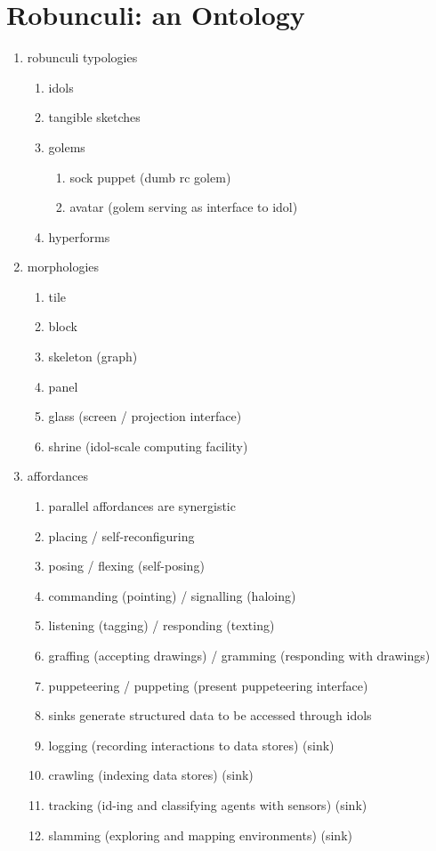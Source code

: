 \section{Robunculi: an Ontology}
\label{sec:robunculi_ontology}
    \begin{enumerate}
        \item robunculi typologies
        \begin{enumerate}
            \item idols
            \item tangible sketches
            \item golems
            \begin{enumerate}
                \item sock puppet (dumb rc golem)
                \item avatar (golem serving as interface to idol)
            \end{enumerate}
            \item hyperforms
        \end{enumerate}
        \item morphologies
        \begin{enumerate}
            \item tile
            \item block
            \item skeleton (graph)
            \item panel
            \item glass (screen / projection interface)
            \item shrine (idol-scale computing facility)
        \end{enumerate}
        \item affordances
        \begin{enumerate}
            \item parallel affordances are synergistic
            \item placing / self-reconfiguring
            \item posing / flexing (self-posing)
            \item commanding (pointing) / signalling (haloing)
            \item listening (tagging) / responding (texting)
            \item graffing (accepting drawings) / gramming (responding with drawings)
            \item puppeteering / puppeting (present puppeteering interface)
            \item sinks generate structured data to be accessed through idols
            \item logging (recording interactions to data stores) (sink)
            \item crawling (indexing data stores) (sink)
            \item tracking (id-ing and classifying agents with sensors) (sink)
            \item slamming (exploring and mapping environments) (sink)
        \end{enumerate}
    \end{enumerate}






